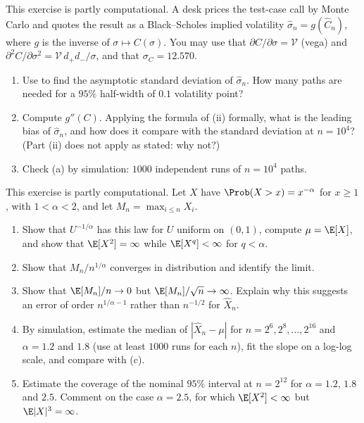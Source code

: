 \begin{exercise}\label{ex:mc-implied-vol}
\medium This exercise is partly computational. A desk prices the test-case call by Monte
Carlo and quotes the result as a Black--Scholes implied volatility $\hat\sigma_n=g(\hat C_n)$,
where $g$ is the inverse of $\sigma\mapsto C(\sigma)$. You may use that
$\partial C/\partial\sigma=\mathcal V$ (vega) and
$\partial^2C/\partial\sigma^2=\mathcal V\,d_+d_-/\sigma$, and that $\sigma_C=12.570$.
\begin{enumerate}[label=(\alph*)]
  \item Use  to find the asymptotic standard deviation of
    $\hat\sigma_n$. How many paths are needed for a $95\%$ half-width of $0.1$ volatility
    point?
  \item Compute $g''(C)$. Applying the formula of (ii) formally,
    what is the leading bias of $\hat\sigma_n$, and how does it compare with the standard
    deviation at $n=10^4$? (Part (ii) does not apply as stated: why not?)
  \item Check (a) by simulation: $1000$ independent runs of $n=10^4$ paths.
\end{enumerate}
\end{exercise}

\begin{exercise}\label{ex:mc-pareto}
\hard This exercise is partly computational. Let $X$ have $\Prob(X>x)=x^{-\alpha}$ for
$x\ge1$, with $1<\alpha<2$, and let $M_n=\max_{i\le n}X_i$.
\begin{enumerate}[label=(\alph*)]
  \item Show that $U^{-1/\alpha}$ has this law for $U$ uniform on $(0,1)$, compute
    $\mu=\E[X]$, and show that $\E[X^2]=\infty$ while $\E[X^q]<\infty$ for $q<\alpha$.
  \item Show that $M_n/n^{1/\alpha}$ converges in distribution and identify the limit.
  \item Show that $\E[M_n]/n\to0$ but $\E[M_n]/\sqrt n\to\infty$. Explain why this suggests
    an error of order $n^{1/\alpha-1}$ rather than $n^{-1/2}$ for $\hat X_n$.
  \item By simulation, estimate the median of $|\hat X_n-\mu|$ for $n=2^6,2^8,\dots,2^{16}$
    and $\alpha=1.2$ and $1.8$ (use at least $1000$ runs for each $n$), fit the slope on a
    log-log scale, and compare with (c).
  \item Estimate the coverage of the nominal $95\%$ interval at $n=2^{12}$ for $\alpha=1.2$,
    $1.8$ and $2.5$. Comment on the case $\alpha=2.5$, for which $\E[X^2]<\infty$ but
    $\E|X|^3=\infty$.
\end{enumerate}
\end{exercise}

